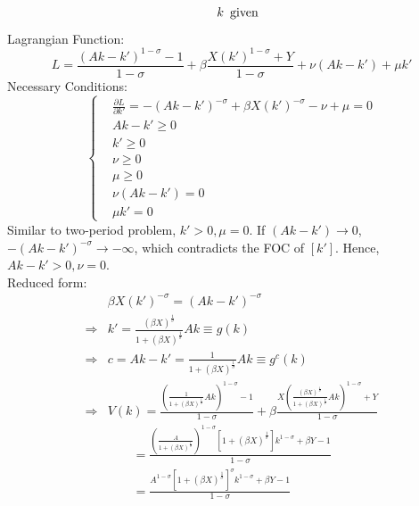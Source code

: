 \documentclass{article}
\begin{document}
\begin{enumerate}
\begin{enumerate}
\begin{align*}
\begin{array}{r@{\quad}l}
                    &k\enspace\text{given} 
                \end{array}
            \end{align*}
            Lagrangian Function:
            \begin{equation*}
                L=\frac{(Ak-k')^{1-\sigma}-1}{1-\sigma}+\beta \frac{X(k')^{1-\sigma}+Y}{1-\sigma}+\nu(Ak-k')+\mu k'
            \end{equation*}
            Necessary Conditions:
            \begin{equation*}
                \left\{\begin{aligned}
                    &\frac{\partial L}{\partial k'}=-(Ak-k')^{-\sigma}+\beta X(k')^{-\sigma}-\nu+\mu=0\\
                    &Ak-k'\ge0\\
                    &k'\ge0\\
                    &\nu\ge0\\
                    &\mu\ge0\\
                    &\nu(Ak-k')=0\\
                    &\mu k'=0
                \end{aligned}\right.
            \end{equation*}
            Similar to two-period problem, $k'>0,\mu=0$. If $(Ak-k')\to0$, $-(Ak-k')^{-\sigma}\to-\infty$, which contradicts the FOC of $[k']$. Hence, $Ak-k'>0,\nu=0$.\\
            Reduced form:
            \begin{align*}
                &\beta X(k')^{-\sigma}=(Ak-k')^{-\sigma}\\
                \Rightarrow&k'=\frac{(\beta X)^\frac1{\sigma}}{1+(\beta X)^\frac1{\sigma}}Ak\equiv g(k)\\
                \Rightarrow&c=Ak-k'=\frac{1}{1+(\beta X)^\frac1{\sigma}}Ak\equiv g^c(k)\\
                \Rightarrow&V(k)=\frac{\left(\frac{1}{1+(\beta X)^\frac1{\sigma}}Ak\right)^{1-\sigma}-1}{1-\sigma}+\beta\frac{X\left(\frac{(\beta X)^\frac1{\sigma}}{1+(\beta X)^\frac1{\sigma}}Ak\right)^{1-\sigma}+Y}{1-\sigma}\\
                &\qquad=\frac{\left(\frac{A}{1+(\beta X)^\frac1{\sigma}}\right)^{1-\sigma}[1+(\beta X)^\frac1{\sigma}]k^{1-\sigma}+\beta Y-1}{1-\sigma}\\
                &\qquad=\frac{A^{1-\sigma}[1+(\beta X)^\frac1{\sigma}]^\sigma k^{1-\sigma}+\beta Y-1}{1-\sigma}
            \end{align*}

\end{enumerate}
\end{enumerate}
\end{document}

